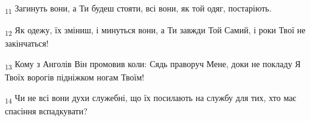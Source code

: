 \begin{tcolorbox}
\textsubscript{11} Загинуть вони, а Ти будеш стояти, всі вони, як той одяг, постаріють.
\end{tcolorbox}
\begin{tcolorbox}
\textsubscript{12} Як одежу, їх зміниш, і минуться вони, а Ти завжди Той Самий, і роки Твої не закінчаться!
\end{tcolorbox}
\begin{tcolorbox}
\textsubscript{13} Кому з Анголів Він промовив коли: Сядь праворуч Мене, доки не покладу Я Твоїх ворогів підніжком ногам Твоїм!
\end{tcolorbox}
\begin{tcolorbox}
\textsubscript{14} Чи не всі вони духи служебні, що їх посилають на службу для тих, хто має спасіння вспадкувати?
\end{tcolorbox}
